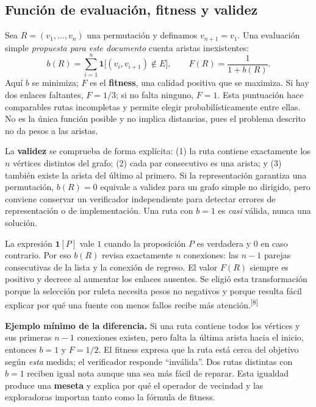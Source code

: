 \documentclass[11pt,letterpaper]{article}
\newcommand{\src}[1]{\textsuperscript{\textcolor{cian}{[#1]}}}
\begin{document}
\subsection{Función de evaluación, fitness y validez}
Sea $R=(v_1,\ldots,v_n)$ una permutación y definamos $v_{n+1}=v_1$. Una evaluación simple \emph{propuesta para este documento} cuenta aristas inexistentes:
\begin{equation}
b(R)=\sum_{i=1}^{n}\mathbf{1}\bigl[(v_i,v_{i+1})\notin E\bigr],
\qquad F(R)=\frac{1}{1+b(R)}.\label{eq:fitness}
\end{equation}
Aquí $b$ se minimiza; $F$ es el \textbf{fitness}, una calidad positiva que se maximiza. Si hay dos enlaces faltantes, $F=1/3$; si no falta ninguno, $F=1$. Esta puntuación hace comparables rutas incompletas y permite elegir probabilísticamente entre ellas. No es la única función posible y no implica distancias, pues el problema descrito no da pesos a las aristas.

La \textbf{validez} se comprueba de forma explícita: (1) la ruta contiene exactamente los $n$ vértices distintos del grafo; (2) cada par consecutivo es una arista; y (3) también existe la arista del último al primero. Si la representación garantiza una permutación, $b(R)=0$ equivale a validez para un grafo simple no dirigido, pero conviene conservar un verificador independiente para detectar errores de representación o de implementación. Una ruta con $b=1$ es \emph{casi} válida, nunca una solución.

La expresión $\mathbf{1}[P]$ vale $1$ cuando la proposición $P$ es verdadera y $0$ en caso contrario. Por eso $b(R)$ revisa exactamente $n$ conexiones: las $n-1$ parejas consecutivas de la lista y la conexión de regreso. El valor $F(R)$ siempre es positivo y decrece al aumentar los enlaces ausentes. Se eligió esta transformación porque la selección por ruleta necesita pesos no negativos y porque resulta fácil explicar por qué una fuente con menos fallos recibe más atención.\src{8}

\textbf{Ejemplo mínimo de la diferencia.} Si una ruta contiene todos los vértices y sus primeras $n-1$ conexiones existen, pero falta la última arista hacia el inicio, entonces $b=1$ y $F=1/2$. El fitness expresa que la ruta está cerca del objetivo según \emph{esta} medida; el verificador responde ``inválida''. Dos rutas distintas con $b=1$ reciben igual nota aunque una sea más fácil de reparar. Esta igualdad produce una \textbf{meseta} y explica por qué el operador de vecindad y las exploradoras importan tanto como la fórmula de fitness.
\end{document}
